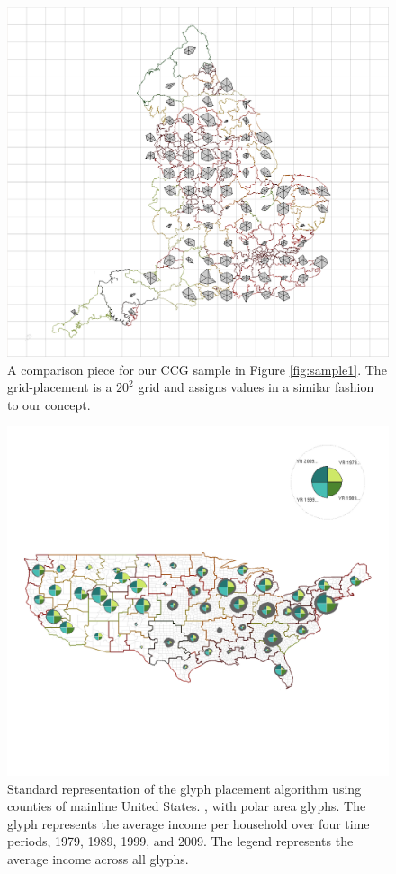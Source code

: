 \begin{figure} \centering
\includegraphics[width=1\textwidth]{images/ch5/CCGgridBFull.png}
\caption{A comparison piece for our CCG sample in Figure \ref{fig:sample1}. The grid-placement is a $20^2$ grid and assigns values in a similar fashion to our concept.}
\end{figure}
\begin{figure} \centering
\includegraphics[width=1\textwidth]{images/ch5/USgridAFull.png}
\caption{Standard representation of the glyph placement algorithm using counties of mainline United States. \cite{usCounties}, with polar area glyphs. The glyph represents the average income per household over four time periods, 1979, 1989, 1999, and 2009. The legend represents the average income across all glyphs. } \label{fig:sample2}
\end{figure}
